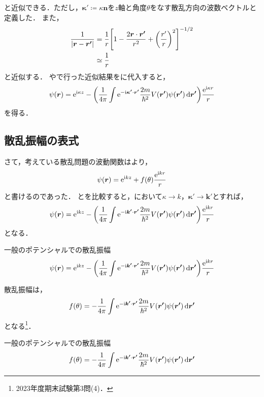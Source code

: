 \documentclass{report}
\begin{document}
    と近似できる．ただし，$\bm{\kappa'} \coloneqq \kappa \bm{n}$を$z$軸と角度$\theta$をなす散乱方向の波数ベクトルと定義した．
    また，
    \begin{align}
      \frac{1}{\abs{\bm{r} - \bm{r'}}} &= \frac{1}{r}\qty[1 - \frac{2\bm{r}\cdot\bm{r'}}{r^2} + \qty(\frac{r'}{r})^2]^{-1/2} \\ 
      &\simeq \frac{1}{r}\label{abs-r-r-prime-inv-approx}
    \end{align}
    と近似する．%
    やで行った近似結果をに代入すると，
    \begin{align}
      \psi(\bm{r}) = \mathrm{e}^{\mathrm{i}\kappa z} - \qty(\frac{1}{4\pi} \int \mathrm{e}^{-\mathrm{i}\bm{\kappa'}\cdot \bm{r'}} \frac{2m}{\hbar^2}V(\bm{r'})\psi(\bm{r'})\dd{\bm{r'}})\frac{\mathrm{e}^{\mathrm{i}\kappa r}}{r}\label{psi-r-in-sc-kappa}
    \end{align}
    を得る．
  \subsection{散乱振幅の表式}
    さて，考えている散乱問題の波動関数はより，
    \begin{align}
      \psi(\bm{r}) = \mathrm{e}^{\mathrm{i} kz} + f(\theta) \frac{\mathrm{e}^{\mathrm{i} kr}}{r}\label{psi-r-in-sc-k-re}
    \end{align}
    と書けるのであった．
    とを比較すると，において$\kappa \to k$，$\bm{\kappa'} \to \bm{k'}$とすれば，
    \begin{align}
      \psi(\bm{r}) = \mathrm{e}^{\mathrm{i} kz} - \qty(\frac{1}{4\pi} \int \mathrm{e}^{-\mathrm{i}\bm{k'}\cdot \bm{r'}} \frac{2m}{\hbar^2}V(\bm{r'})\psi(\bm{r'})\dd{\bm{r'}})\frac{\mathrm{e}^{\mathrm{i} kr}}{r}
    \end{align}
    となる．
    \begin{itembox}[l]{一般のポテンシャルでの散乱振幅}
      \begin{align}
        \psi(\bm{r}) = \mathrm{e}^{\mathrm{i} kz} - \qty(\frac{1}{4\pi} \int \mathrm{e}^{-\mathrm{i}\bm{k'}\cdot \bm{r'}} \frac{2m}{\hbar^2}V(\bm{r'})\psi(\bm{r'})\dd{\bm{r'}})\frac{\mathrm{e}^{\mathrm{i} kr}}{r}
      \end{align}
    \end{itembox}
    散乱振幅は，
    \begin{align}
      f(\theta) = -\frac{1}{4\pi} \int \mathrm{e}^{- \mathrm{i} \bm{k'} \cdot \bm{r'}} \frac{2m}{\hbar^2}V(\bm{r'})\psi(\bm{r'})\dd{\bm{r'}}
    \end{align}
    となる\footnote{2023年度期末試験第3問(4)．}．
    \begin{itembox}[l]{一般のポテンシャルでの散乱振幅}
      \begin{align}
        f(\theta) = -\frac{1}{4\pi} \int \mathrm{e}^{- \mathrm{i} \bm{k'} \cdot \bm{r'}} \frac{2m}{\hbar^2}V(\bm{r'})\psi(\bm{r'})\dd{\bm{r'}}\label{scattering-amp-general}
      \end{align}
    \end{itembox}
\end{document}
